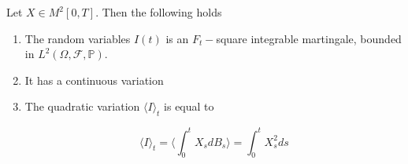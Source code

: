\begin{theorem}
    Let $X \in M^2[0,T]$. Then the following holds
\begin{enumerate}
    \item The random variables $I(t)$ is an $F_t-$square integrable martingale, bounded in $L^2(\Omega,\mathcal{F},\mathbb{P})$. 
    \item It has a continuous variation
    \item The quadratic variation $\langle I \rangle_t$ is equal to

    \begin{equation}
        \langle I \rangle_t = \big\langle \int_0^t X_s dB_s \big\rangle = \int_0^t X_s^2 ds
    \end{equation}
\end{enumerate}
\end{theorem}
